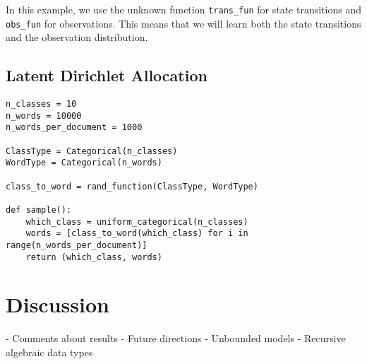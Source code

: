 \documentclass[proceed]{article}
\begin{document}
In this example, we use the unknown function \texttt{trans\_fun} for state transitions and \texttt{obs\_fun} for observations.  This means that we will learn both the state transitions and the observation distribution.

\subsection{Latent Dirichlet Allocation}

\begin{verbatim}
n_classes = 10
n_words = 10000
n_words_per_document = 1000

ClassType = Categorical(n_classes)
WordType = Categorical(n_words)

class_to_word = rand_function(ClassType, WordType)

def sample():
    which_class = uniform_categorical(n_classes)
    words = [class_to_word(which_class) for i in range(n_words_per_document)]
    return (which_class, words)
\end{verbatim}

  \section{Discussion}

  - Comments about results
  - Future directions
    - Unbounded models
    - Recursive algebraic data types
\end{document}
